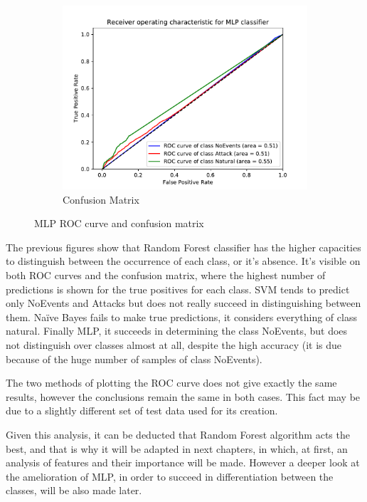 \begin{figure}[H]
\begin{subfigure}[t]{0.3\textwidth}
        \includegraphics[page=2, width=\linewidth, trim= 0 50 0 100, clip]{images/results_scikit/MLP}
        \caption{Confusion Matrix}
        \label{fig:scikit_MLP_CM}
    \end{subfigure}
    \caption{MLP ROC curve and confusion matrix}
    \label{fig:ROCCM_MLP}
\end{figure}

The previous figures show that Random Forest classifier has the higher capacities to distinguish between the occurrence of each class, or it's absence. It's visible on both ROC curves and the confusion matrix, where the highest number of predictions is shown for the true positives for each class. SVM tends to predict only NoEvents and Attacks but does not really succeed in distinguishing between them. Naïve Bayes fails to make true predictions, it considers everything of class natural. Finally MLP, it succeeds in determining the class NoEvents, but does not distinguish over classes almost at all, despite the high accuracy (it is due because of the huge number of samples of class NoEvents).

The two methods of plotting the ROC curve does not give exactly the same results, however the conclusions remain the same in both cases. This fact may be due to a slightly different set of test data used for its creation.

Given this analysis, it can be deducted that Random Forest algorithm acts the best, and that is why it will be adapted in next chapters, in which, at first, an analysis of features and their importance will be made. However a deeper look at the amelioration of MLP, in order to succeed in differentiation between the classes, will be also made later.

